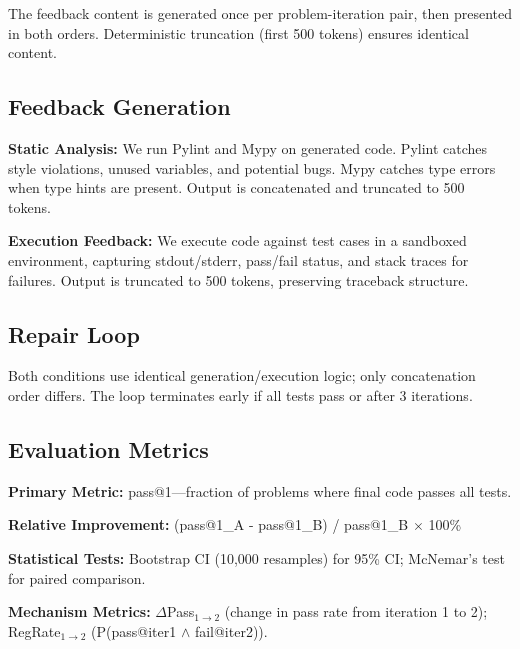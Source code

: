 The feedback content is generated once per problem-iteration pair, then presented in both orders. Deterministic truncation (first 500 tokens) ensures identical content.

\subsection{Feedback Generation}

\textbf{Static Analysis:} We run Pylint and Mypy on generated code. Pylint catches style violations, unused variables, and potential bugs. Mypy catches type errors when type hints are present. Output is concatenated and truncated to 500 tokens.

\textbf{Execution Feedback:} We execute code against test cases in a sandboxed environment, capturing stdout/stderr, pass/fail status, and stack traces for failures. Output is truncated to 500 tokens, preserving traceback structure.

\subsection{Repair Loop}

Both conditions use identical generation/execution logic; only concatenation order differs. The loop terminates early if all tests pass or after 3 iterations.

\subsection{Evaluation Metrics}

\textbf{Primary Metric:} pass@1---fraction of problems where final code passes all tests.

\textbf{Relative Improvement:} (pass@1\_A - pass@1\_B) / pass@1\_B $\times$ 100\%

\textbf{Statistical Tests:} Bootstrap CI (10,000 resamples) for 95\% CI; McNemar's test for paired comparison.

\textbf{Mechanism Metrics:} $\Delta$Pass$_{1\rightarrow2}$ (change in pass rate from iteration 1 to 2); RegRate$_{1\rightarrow2}$ (P(pass@iter1 $\land$ fail@iter2)).
